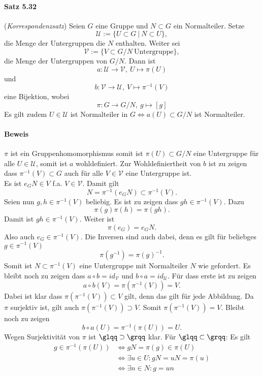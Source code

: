 \documentclass{scrartcl}
\begin{document}
\paragraph{Satz 5.32} (\textit{Korrespondenzsatz}) Seien $G$ eine Gruppe und $N
\subset G$ ein Normalteiler. Setze
\[
  \mathcal{U} := \{U \subset G ~|~ N \subset U\},
\]
die Menge der Untergruppen die $N$ enthalten. Weiter sei
\[
  \mathcal{V} := \{V \subset G/N ~\text{Untergruppe}\},
\]
die Menge der Untergruppen von $G/N$.
Dann ist
\[
  a: \mathcal{U} \to \mathcal{V},~U \mapsto \pi(U)
\]
und
\[
  b: \mathcal{V} \to \mathcal{U},~V \mapsto \pi^{-1}(V)
\]
eine Bijektion, wobei
\[
  \pi: G \to G/N,~g \mapsto [g]
\]
Es gilt zudem $U \in \mathcal{U}$ ist Normalteiler in $G \Leftrightarrow a(U)
\subset G/N$ ist Normalteiler.
\paragraph{Beweis}
$\pi$ ist ein Gruppenhomomorphismus somit ist $\pi(U) \subset G/N$ eine
Untergruppe für alle $U \in \mathcal{U}$, somit ist $a$ wohldefiniert. Zur
Wohldefiniertheit von $b$ ist zu zeigen dass $\pi^{-1}(V) \subset G$ auch für
alle $V \in \mathcal{V}$ eine Untergruppe ist. \\
Es ist $e_GN \in V$ f.a. $V \in \mathcal{V}$. Damit gilt
\[
  N = \pi^{-1}(e_GN) \subset \pi^{-1}(V).
\]
Seien nun $g,h \in \pi^{-1}(V)$ beliebig. Es ist zu zeigen dass $gh \in
\pi^{-1}(V)$. Dazu
\[
  \pi(g)\pi(h)=\pi(gh).
\]
Damit ist $gh \in \pi^{-1}(V)$. Weiter ist
\[
  \pi(e_G)=e_GN.
\]
Also auch $e_G \in \pi^{-1}(V)$. Die Inversen sind auch dabei, denn es gilt für
beliebges $g \in \pi^{-1}(V)$
\[
  \pi(g^{-1})=\pi(g)^{-1}.
\]
Somit ist $N \subset \pi^{-1}(V)$ eine Untergruppe mit Normalteiler $N$ wie gefordert.
Es bleibt noch zu zeigen dass $a \circ b = id_{\mathcal{V}}$ und $b \circ a =
id_{\mathcal{U}}$. Für dass erste ist zu zeigen
\[
  a \circ b(V) = \pi(\pi^{-1}(V)) = V.
\]
Dabei ist klar dass $\pi(\pi^{-1}(V)) \subset V$ gilt, denn das gilt für jede
Abbildung. Da $\pi$ surjektiv ist, gilt auch $\pi(\pi^{-1}(V)) \supset V$. Somit
$\pi(\pi^{-1}(V)) = V$. Bleibt noch zu zeigen
\[
  b \circ a(U) = \pi^{-1}(\pi(U)) = U.
\]
Wegen Surjektivität von $\pi$ ist $\glqq \supset \grqq$ klar. Für $\glqq \subset
\grqq$: Es gilt
\begin{align*}
  g \in \pi^{-1}(\pi(U)) &\iff gN = \pi(g) \in \pi(U) \\
                         &\iff \exists u \in U: gN = uN = \pi(u) \\
                         &\iff \exists n \in N: g = un
\end{align*}
\end{document}
